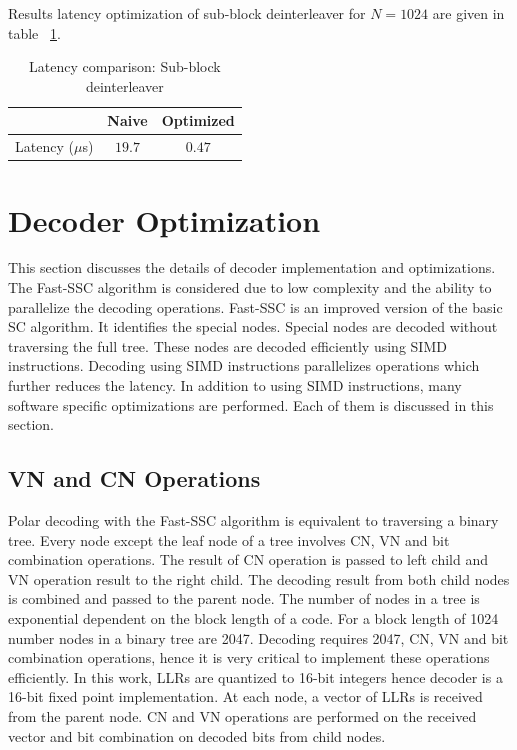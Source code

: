 Results latency optimization of sub-block deinterleaver for $N = 1024$ are given in table ~\ref{tab:subblockDeinterleaverLatency}.
\begin{table}[!h]
	\begin{center}
		\caption{Latency comparison: Sub-block deinterleaver}
		\label{tab:subblockDeinterleaverLatency}
		\begin{tabular}{c|c|c} %
			\textbf{ } & Naive & Optimized \\
			\hline
			Latency ($\mu$s) & $19.7$ & $0.47$\\
		\end{tabular}
	\end{center}
\end{table}

\section{Decoder Optimization}
This section discusses the details of decoder implementation and optimizations. The Fast-SSC algorithm is considered due to low complexity and the ability to parallelize the decoding operations. Fast-SSC is an improved version of the basic SC algorithm. It identifies the special nodes. Special nodes are decoded without traversing the full tree. These nodes are decoded efficiently using SIMD instructions. Decoding using SIMD instructions parallelizes operations which further reduces the latency. In addition to using SIMD instructions, many software specific optimizations are performed. Each of them is discussed in this section.

\subsection{VN and CN Operations}
Polar decoding with the Fast-SSC algorithm is equivalent to traversing a binary tree. Every node except the leaf node of a tree involves CN, VN and bit combination operations. The result of CN operation is passed to left child and VN operation result to the right child. The decoding result from both child nodes is combined and passed to the parent node. The number of nodes in a tree is exponential dependent on the block length of a code. For a block length of 1024 number nodes in a binary tree are 2047. Decoding requires 2047, CN, VN and bit combination operations, hence it is very critical to implement these operations efficiently. In this work, LLRs are quantized to 16-bit integers hence decoder is a 16-bit fixed point implementation. At each node, a vector of LLRs is received from the parent node. CN and VN operations are performed on the received vector and bit combination on decoded bits from child nodes.

